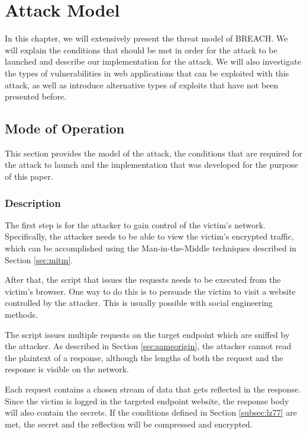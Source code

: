 \chapter{Attack Model}\label{ch:attack}

In this chapter, we will extensively present the threat model of BREACH. We will
explain the conditions that should be met in order for the attack to be
launched and describe our implementation for the attack. We will also
investigate the types of vulnerabilities in web applications that can be
exploited with this attack, as well as introduce alternative types of exploits
that have not been presented before.

\section{Mode of Operation}\label{sec:mo}

This section provides the model of the attack, the conditions that are required
for the attack to launch and the implementation that was developed for the
purpose of this paper.

\subsection{Description}

The first step is for the attacker to gain control of the victim's network.
Specifically, the attacker needs to be able to view the victim's encrypted
traffic, which can be accomplished using the Man-in-the-Middle techniques
described in Section \ref{sec:mitm}.

After that, the script that issues the requests needs to be executed from the
victim's browser. One way to do this is to persuade the victim to visit a
website controlled by the attacker. This is usually possible with social
engineering methods.

The script issues multiple requests on the target endpoint which are sniffed by
the attacker. As described in Section \ref{sec:sameorigin}, the attacker cannot
read the plaintext of a response, although the lengths of both the request and
the response is visible on the network.

Each request contains a chosen stream of data that gets reflected in the
response. Since the victim is logged in the targeted endpoint website, the
response body will also contain the secrets. If the conditions defined in
Section \ref{subsec:lz77} are met, the secret and the reflection will be
compressed and encrypted.

